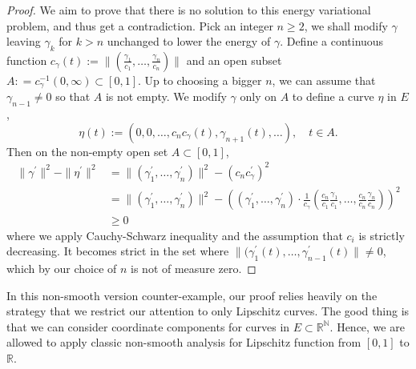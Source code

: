 \begin{proof}
	We aim to prove that there is no solution to this energy variational problem,
	and thus get a contradiction.
	Pick an integer $n \geq 2$,
	we shall modify $\gamma$ leaving $\gamma_k$ for $ k > n$ unchanged to lower the energy of $\gamma$.
	Define a continuous function
	$ c_{\gamma}(t) := \|(\frac{\gamma_1}{c_1}, \ldots, \frac{\gamma_n}{c_n} )\|$
	and an open subset $A: = c_\gamma^{-1}(0, \infty) \subset [0,1]$.
	Up to choosing a bigger $n$,
	we can assume that $ \gamma_{n-1} \neq 0$ so that $A$ is not empty.
	We modify $\gamma$ only on $A$ to define a curve $\eta$ in $E$,
	\[
		\eta(t) := (0,0,\ldots, c_n c_{\gamma}(t),\gamma_{n+1}(t),\ldots),\quad t \in A.
	\]
	Then on the non-empty open set $A \subset [0,1]$,
	\begin{align*}
		\| \gamma^\prime \|^2 - \| \eta^\prime \|^2 & =
		\|( \gamma_1^\prime,\ldots, \gamma_n^\prime )\|^2- (c_n c_\gamma^\prime)^2                         \\
		                                            & = \|( \gamma_1^\prime,\ldots, \gamma_n^\prime )\|^2-
		((\gamma_1^\prime, \ldots, \gamma_n^\prime) \cdot \frac{1}{c_\gamma}
		(\frac{c_n}{c_1} \frac{\gamma_1}{c_1}, \ldots, \frac{c_n}{c_n} \frac{\gamma_n}{c_n}))^2            \\
		                                            & \geq 0
	\end{align*}
	where we apply Cauchy-Schwarz inequality and the assumption that $c_i$ is strictly decreasing.
	It becomes strict in the set where $\| (\gamma_1^\prime(t), \ldots, \gamma_{n-1}^\prime(t)\| \ne 0$,
	which by our choice of $n$ is not of measure zero.
\end{proof}

\begin{rmk}
	In this non-smooth version counter-example, our proof relies heavily on the
	strategy that we restrict our attention to only Lipschitz curves.
	The good thing is that we can consider coordinate components for curves in $E \subset \mathbb{R}^\mathbb{N}$.
	Hence, we are allowed to apply classic non-smooth analysis for Lipschitz function from $[0,1]$ to $\mathbb{R}$.
\end{rmk}
